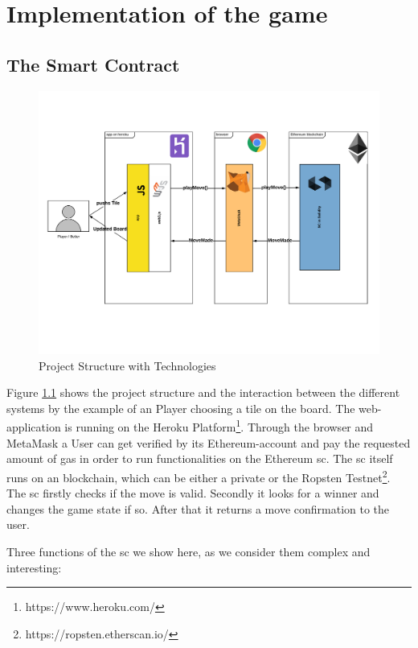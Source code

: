 \chapter{Implementation of the game}\label{ch:implementation}
\section{The Smart Contract}
	\begin{figure}[ht]
		\begin{center}
			\includegraphics[scale=0.4]{res/project_structure}
		\end{center}
		\caption{Project Structure with Technologies}
		\label{fig:project_structure}
	\end{figure}	
Figure \ref{fig:project_structure} shows the project structure and the interaction between the different systems by the example of an Player choosing a tile on the board.
The web-application is running on the Heroku Platform\footnote{https://www.heroku.com/}. Through the browser and MetaMask a User can get verified by its Ethereum-account and pay the requested amount of gas in order to run functionalities on the Ethereum \ac{sc}. The \ac{sc} itself runs on an blockchain, which can be either a private or the Ropsten Testnet\footnote{https://ropsten.etherscan.io/}.\\
The \ac{sc} firstly checks if the move is valid. Secondly it looks for a winner and changes the game state if so. After that it returns a move confirmation to the user.

Three functions of the \ac{sc} we show here, as we consider them complex and interesting:\\


